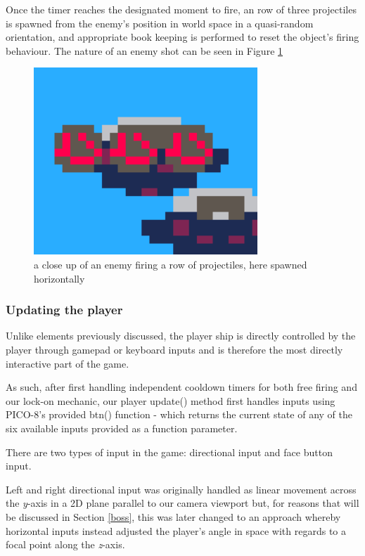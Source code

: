 \documentclass[11pt]{article}
\begin{document}
Once the timer reaches the designated moment to fire, an row of three projectiles is spawned
from the enemy's position in world space in a quasi-random orientation, and appropriate book
keeping is performed to reset the object's firing behaviour. The nature of an enemy shot can be
seen in Figure \ref{fig:enemyfire}

\begin{figure}[h]
    \centering
    \includegraphics[width=.8\textwidth]{enemy_fire}
    \caption{a close up of an enemy firing a row of projectiles, here spawned horizontally}
    \label{fig:enemyfire}
\end{figure}

\subsubsection*{Updating the player}

Unlike elements previously discussed, the player ship is directly controlled by the player through
gamepad or keyboard inputs and is therefore the most directly interactive part of the game.

As such, after first handling independent cooldown timers for both free firing and our lock-on mechanic,
our player update() method first handles inputs using PICO-8's provided btn() function - which returns
the current state of any of the six available inputs provided as a function parameter.

There are two types of input in the game: directional input and face button input.

Left and right
directional input was originally handled as linear movement across the \textit{y}-axis in a 2D plane
parallel to our camera viewport but, for reasons that will be discussed in Section \ref{boss}, this
was later changed to an approach whereby horizontal inputs instead adjusted the player's angle
in space with regards to a focal point along the \textit{z}-axis.
\end{document}
